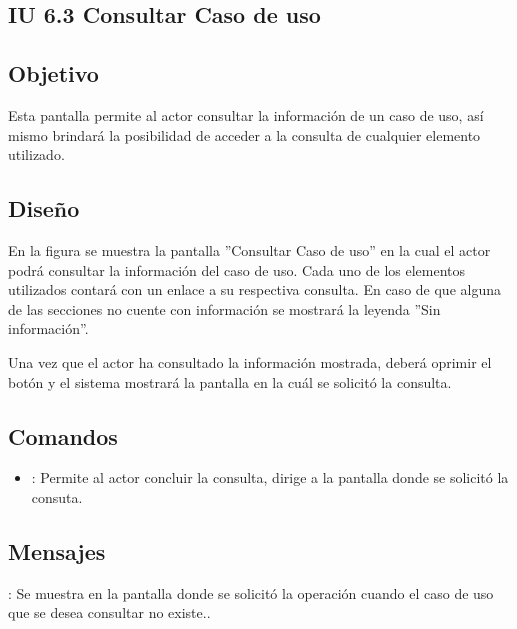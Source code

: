 \subsection{IU 6.3 Consultar Caso de uso}

\subsection{Objetivo}
	Esta pantalla permite al actor consultar la información de un caso de uso, así mismo brindará la posibilidad de acceder a la consulta de cualquier elemento utilizado.
\subsection{Diseño}
	En la figura  se muestra la pantalla ''Consultar Caso de uso'' en la cual el actor podrá consultar la información del caso de uso. Cada uno de los elementos utilizados contará con un enlace a su respectiva consulta. En caso de que alguna de las secciones no cuente con información se mostrará la leyenda ''Sin información''.

Una vez que el actor ha consultado la información mostrada, deberá oprimir el botón  y el sistema mostrará la pantalla en la cuál se solicitó la consulta.

\subsection{Comandos}
\begin{itemize}
	\item {}: Permite al actor concluir la consulta, dirige a la pantalla donde se solicitó la consuta.
\end{itemize}

\subsection{Mensajes}

\begin{Citemize}
	\item {}: Se muestra en la pantalla donde se solicitó la operación cuando el caso de uso que se desea consultar no existe..
\end{Citemize}
